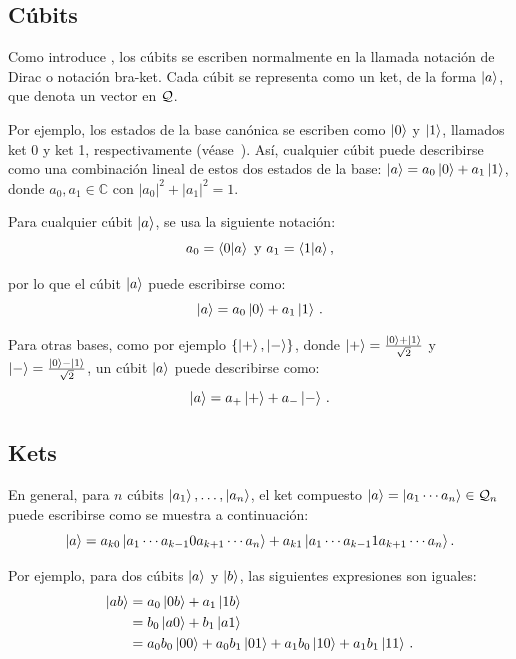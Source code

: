 \subsection{Cúbits}
Como introduce \textcite{diracBraket}, los cúbits se escriben normalmente en la llamada notación de Dirac o notación bra-ket.
Cada cúbit se representa como un ket, de la forma $\ket{a}$, que denota un vector en $\mathcal{Q}$.

Por ejemplo, los estados de la base canónica se escriben como $\ket{0}$ y $\ket{1}$, llamados ket 0 y ket 1, respectivamente (véase~\cite{NielsenChuang}).
Así, cualquier cúbit puede describirse como una combinación lineal de estos dos estados de la base: $\ket{a} =a_0\ket{0} +a_1 \ket{1}$, donde $a_0, a_1 \in \mathbb{C}$ con $|a_0|^{2}+|a_1|^{2}=1$.

\begin{notation}
  Para cualquier cúbit $\ket{a}$, se usa la siguiente notación:
  \[a_{0}=\braket{0}{a}\text{ y }a_{1}=\braket{1}{a},\]
\end{notation}
por lo que el cúbit $\ket{a}$ puede escribirse como:
\begin{equation}
  \label{eq:cúbit-coordenadas}
  \ket{a}=a_0\ket{0}+a_1\ket{1}\,.
\end{equation}

Para otras bases, como por ejemplo $\{\ket{+}, \ket{-}\}$, donde $\ket{+}=\frac{\ket{0}+\ket{1}}{\sqrt{2}}$ y $\ket{-}=\frac{\ket{0}-\ket{1}}{\sqrt{2}}$, un cúbit $\ket{a}$ puede describirse como:
\begin{equation}
  \label{eq:cúbit-coordenadas-h}
  \ket{a}=a_+\ket{+}+a_-\ket{-}\,.
\end{equation}

\subsection{Kets}

En general, para $n$ cúbits $\ket{a_1},\dots,\ket{a_n}$, el ket compuesto $\ket{a}=\ket{a_1\cdots a_n}\in\mathcal{Q}_n$ puede escribirse como se muestra a continuación:
\begin{equation}
  \label{eq:ncubit-coordenadas}
  \ket{a}=a_{k0}\ket{a_1\cdots a_{k-1}0a_{k+1}\cdots a_n}+a_{k1}\ket{a_1\cdots a_{k-1}1a_{k+1}\cdots a_n}.
\end{equation}

Por ejemplo, para dos cúbits $\ket{a}$ y $\ket{b}$, las siguientes expresiones son iguales:
\begin{align*}
  \ket{ab} & =a_0\ket{0b}+a_1\ket{1b}                                            \\
           & =b_0\ket{a0}+b_1\ket{a1}                                            \\
           & =a_0 b_0\ket{00}+a_0 b_1\ket{01}+a_1 b_0\ket{10}+a_1 b_1\ket{11}\,.
\end{align*}

